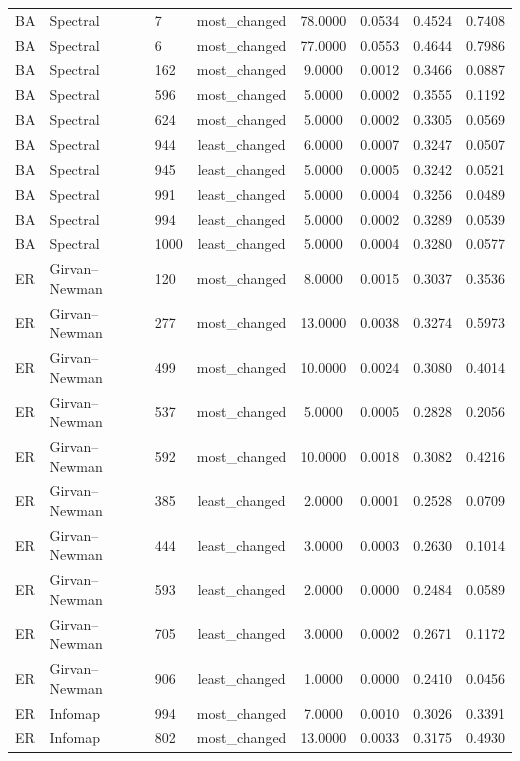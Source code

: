\begin{longtable}{lllccccc}
BA & Spectral & 7 & most\_changed & 78.0000 & 0.0534 & 0.4524 & 0.7408 \\
BA & Spectral & 6 & most\_changed & 77.0000 & 0.0553 & 0.4644 & 0.7986 \\
BA & Spectral & 162 & most\_changed & 9.0000 & 0.0012 & 0.3466 & 0.0887 \\
BA & Spectral & 596 & most\_changed & 5.0000 & 0.0002 & 0.3555 & 0.1192 \\
BA & Spectral & 624 & most\_changed & 5.0000 & 0.0002 & 0.3305 & 0.0569 \\
BA & Spectral & 944 & least\_changed & 6.0000 & 0.0007 & 0.3247 & 0.0507 \\
BA & Spectral & 945 & least\_changed & 5.0000 & 0.0005 & 0.3242 & 0.0521 \\
BA & Spectral & 991 & least\_changed & 5.0000 & 0.0004 & 0.3256 & 0.0489 \\
BA & Spectral & 994 & least\_changed & 5.0000 & 0.0002 & 0.3289 & 0.0539 \\
BA & Spectral & 1000 & least\_changed & 5.0000 & 0.0004 & 0.3280 & 0.0577 \\
ER & Girvan--Newman & 120 & most\_changed & 8.0000 & 0.0015 & 0.3037 & 0.3536 \\
ER & Girvan--Newman & 277 & most\_changed & 13.0000 & 0.0038 & 0.3274 & 0.5973 \\
ER & Girvan--Newman & 499 & most\_changed & 10.0000 & 0.0024 & 0.3080 & 0.4014 \\
ER & Girvan--Newman & 537 & most\_changed & 5.0000 & 0.0005 & 0.2828 & 0.2056 \\
ER & Girvan--Newman & 592 & most\_changed & 10.0000 & 0.0018 & 0.3082 & 0.4216 \\
ER & Girvan--Newman & 385 & least\_changed & 2.0000 & 0.0001 & 0.2528 & 0.0709 \\
ER & Girvan--Newman & 444 & least\_changed & 3.0000 & 0.0003 & 0.2630 & 0.1014 \\
ER & Girvan--Newman & 593 & least\_changed & 2.0000 & 0.0000 & 0.2484 & 0.0589 \\
ER & Girvan--Newman & 705 & least\_changed & 3.0000 & 0.0002 & 0.2671 & 0.1172 \\
ER & Girvan--Newman & 906 & least\_changed & 1.0000 & 0.0000 & 0.2410 & 0.0456 \\
ER & Infomap & 994 & most\_changed & 7.0000 & 0.0010 & 0.3026 & 0.3391 \\
ER & Infomap & 802 & most\_changed & 13.0000 & 0.0033 & 0.3175 & 0.4930 \\

\end{longtable}
